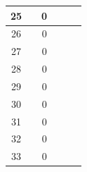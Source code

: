 \begin{table}[]
\begin{tabular}{|c|c|c|c|c|c|}
 		25                                           &                                  & 0                                &                                  &                                  &                                                     \\ \hline
 		26                                           &                                  & 0                                &                                  &                                  &                                                     \\ \hline
 		27                                           &                                  & 0                                &                                  &                                  &                                                     \\ \hline
 		28                                           &                                  & 0                                &                                  &                                  &                                                     \\ \hline
 		29                                           &                                  & 0                                &                                  &                                  &                                                     \\ \hline
 		30                                           &                                  & 0                                &                                  &                                  &                                                     \\ \hline
 		31                                           &                                  & 0                                &                                  &                                  &                                                     \\ \hline
 		32                                           &                                  & 0                                &                                  &                                  &                                                     \\ \hline
 		33                                           &                                  & 0                                &                                  &                                  &                                                     \\ \hline

\end{tabular}
\end{table}
